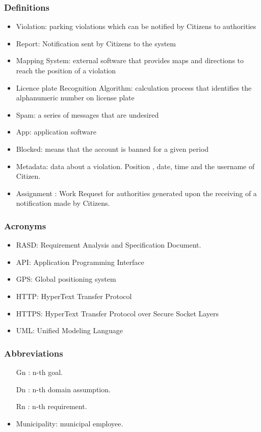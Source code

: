 \subsubsection {Definitions}
\begin{itemize}
\item	Violation: parking violations which can be notified by Citizens to authorities
\item	Report: Notification sent by Citizens to the system
\item	Mapping System: external software that provides maps and directions to reach the position of a violation
\item	Licence plate Recognition Algorithm: calculation process that identifies the alphanumeric number on license plate
\item	Spam: a series of messages that are undesired
\item	App: application software 
\item	Blocked: means that the account is banned for a given period
\item	Metadata: data about a violation. Position , date,  time and the username of Citizen. 
\item	Assignment : Work Request for authorities generated upon the receiving of a notification made by Citizens.
\end{itemize}
\subsubsection {Acronyms}
\begin{itemize}
\item	RASD: Requirement Analysis and Specification Document.
\item	API: Application Programming Interface
\item	GPS: Global positioning system
\item	HTTP: HyperText Transfer Protocol
\item	HTTPS: HyperText Transfer Protocol over Secure Socket Layers
\item	UML: Unified Modeling Language

\end{itemize}
\subsubsection {Abbreviations}
\begin{itemize}
\item	[Gn]: n-th goal.
\item	[Dn]: n-th domain assumption.
\item	[Rn]: n-th requirement.
\item     Municipality: municipal employee.
\end{itemize}
